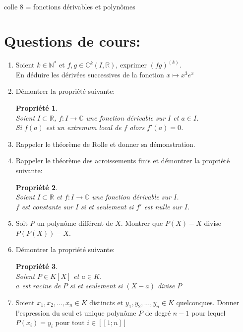 \documentclass[a4paper,10pt]{article}
\newtheorem*{pro}{Propriété}
\theoremstyle{definition}
\theoremstyle{definition}
\newcommand{\C}{\mathbb{C}}
\newcommand{\R}{\mathbb{R}}
\newcommand{\N}{\mathbb{N}}
\begin{document}
	
	
	\begin{center}
		\Large \sc colle 8 =   fonctions dérivables et polynômes
	\end{center}
	
\section *{Questions de cours:}

\begin{enumerate} 

\item Soient $k\in\N^*$ et $f,g\in\mathbb{C}^k\left(I,\R\right)$, exprimer $(fg)^{(k)}$. \\En déduire les dérivées successives de la fonction $x\mapsto x^3e^x$

\item Démontrer la propriété suivante:
\begin{pro}\hfil\\
Soient $I\subset\R$, $f:I\rightarrow\C$ une fonction dérivable sur $I$ et $a\in I$. \\Si $f(a)$ est un extremum local de $f$ alors $f'(a)=0$. 
\end{pro}
\item Rappeler le théorème de Rolle et donner sa démonstration.
\item Rappeler le théorème des acroissements finis et démontrer la propriété suivante:
\begin{pro}\hfil\\
Soient $I\subset\R$ et $f:I\rightarrow\C$ une fonction dérivable sur $I$. \\
$f$ est constante sur $I$ si et seulement si $f'$ est nulle sur $I$.
\end{pro}
\item Soit $P$ un polynôme différent de $X$. Montrer que $P(X)-X$ divise $P(P(X))-X$.
\item Démontrer la propriété suivante:
\begin{pro}\hfil\\
Soient $P\in K[X]$ et $a\in K$.\\
$a$ est racine de $P$ si et seulement si $(X-a)$ divise $P$
\end{pro}
\item Soient $x_1,x_2,...,x_n\in K$ distincts et $y_1,y_2,...,y_n\in K$ quelconques. Donner l'espression du seul et unique polynôme $P$ de degré $n-1$ pour lequel $P(x_i)=y_i$ pour tout $i\in [\![1;n]\!] $ 
\end{enumerate}
\end{document}
